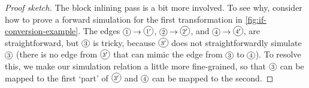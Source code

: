 \begin{theorem}
\begin{proof}[Proof sketch]
      The block inlining pass is a bit more involved.  To see why, consider how
      to prove a forward simulation for the first transformation in
      \cref{fig:if-conversion-example}. The edges
      $\ifconvlabel{$1$}\rightarrow\ifconvlabel{$1^\prime$}$,
          $\ifconvlabel{$2$}\rightarrow\ifconvlabel{$2^\prime$}$, and
              $\ifconvlabel{$4$}\rightarrow\ifconvlabel{$4^\prime$}$, are straightforward,
                  but $\ifconvlabel{$3$}$ is tricky, because
                    $\ifconvlabel{$3^\prime$}$ does not straightforwardly simulate
                      $\ifconvlabel{$3$}$ (there is no edge from
                        $\ifconvlabel{$3^\prime$}$ that can mimic the edge from
                          $\ifconvlabel{$3$}$ to $\ifconvlabel{$4$}$). To resolve
                              this, we make our simulation relation a little
                              more fine-grained, so that $\ifconvlabel{$3$}$ can
                                be mapped to the first `part' of
                                $\ifconvlabel{$3^\prime$}$ and $\ifconvlabel{$4$}$ can be
                                    mapped to the second.

\end{proof}
\end{theorem}
